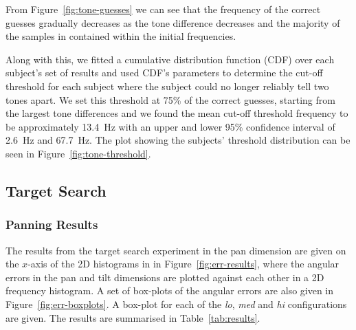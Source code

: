 \documentclass[format=sigconf, review=true, screen=true, anonymous=true]{acmart}
\begin{document}
From Figure~\ref{fig:tone-guesses} we can see that the frequency of the correct guesses gradually decreases as the tone difference decreases and the majority of the samples in contained within the initial frequencies. 

Along with this, we fitted a cumulative distribution function (CDF) over each subject's set of results and used CDF's parameters to determine the cut-off threshold for each subject where the subject could no longer reliably tell two tones apart. We set this threshold at 75\% of the correct guesses, starting from the largest tone differences and we found the mean cut-off threshold frequency to be approximately \SI{13.4}{\hertz} with an upper and lower 95\% confidence interval of \SI{2.6}{\hertz} and \SI{67.7}{\hertz}. The plot showing the subjects' threshold distribution can be seen in Figure~\ref{fig:tone-threshold}. 


\subsection{Target Search}

\subsubsection{Panning Results}

The results from the target search experiment in the pan dimension are given on the $x$-axis of the 2D histograms in in Figure~\ref{fig:err-results}, where the angular errors in the pan and tilt dimensions are plotted against each other in a 2D frequency histogram. A set of box-plots of the angular errors are also given in Figure~\ref{fig:err-boxplots}. A box-plot for each of the \emph{lo}, \emph{med} and \emph{hi} configurations are given. The results are summarised in Table~\ref{tab:results}.
\end{document}
